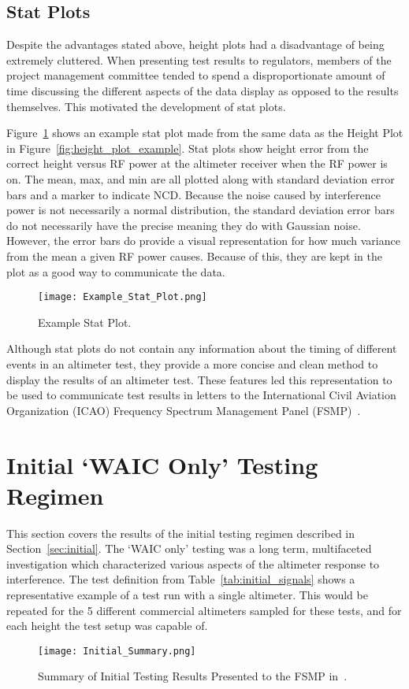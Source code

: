 \subsection{Stat Plots}
Despite the advantages stated above, height plots had a disadvantage of being extremely cluttered. When presenting test results to regulators, members of the project management committee tended to spend a disproportionate amount of time discussing the different aspects of the data display as opposed to the results themselves. This motivated the development of stat plots.

Figure~\ref{fig:stat_plot_example} shows an example stat plot made from the same data as the Height Plot in Figure~\ref{fig:height_plot_example}. Stat plots show height error from the correct height versus RF power at the altimeter receiver when the RF power is on. The mean, max, and min are all plotted along with standard deviation error bars and a marker to indicate NCD. Because the noise caused by interference power is not necessarily a normal distribution, the standard deviation error bars do not necessarily have the precise meaning they do with Gaussian noise. However, the error bars do provide a visual representation for how much variance from the mean a given RF power causes. Because of this, they are kept in the plot as a good way to communicate the data.  
\begin{figure}[h!]
	\centering
	\texttt{[image: Example\_Stat\_Plot.png]}
	\caption{Example Stat Plot.}
	\label{fig:stat_plot_example}
\end{figure}

 Although stat plots do not contain any information about the timing of different events in an altimeter test, they provide a more concise and clean method to display the results of an altimeter test. These features led this representation to be used to communicate test results in letters to the International Civil Aviation Organization (ICAO) Frequency Spectrum Management Panel (FSMP)~\cite{uwe_radio_2019}. 
 
 
\section{Initial `WAIC Only' Testing Regimen}\label{sec:initial_results}

This section covers the results of the initial testing regimen described in Section~\ref{sec:initial}. The `WAIC only' testing was a long term, multifaceted investigation which characterized various aspects of the altimeter response to interference. The test definition from Table~\ref{tab:initial_signals} shows a representative example of a test run with a single altimeter. This would be repeated for the 5 different commercial altimeters sampled for these tests, and for each height the test setup was capable of. 
\begin{figure}[h!]
	\centering
	\texttt{[image: Initial\_Summary.png]}
	\caption{Summary of Initial Testing Results Presented to the FSMP in~\cite{uwe_radio_2019}.}
	\label{fig:initial_summary}
\end{figure}

